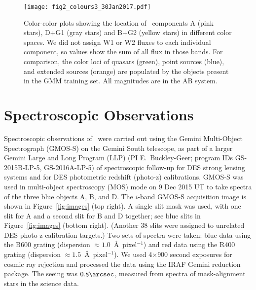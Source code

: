\documentclass[twocolumn]{aastex6}
\begin{document}
\begin{figure*}
\begin{center}
\hspace*{-1.5cm}\texttt{[image: fig2\_colours3\_30Jan2017.pdf]}
\end{center}
\caption{Color-color plots showing the location of \sysname\ components 
A (pink stars), D+G1 (gray stars) and B+G2 (yellow stars) in different color 
spaces. 
We did not assign W1 or W2 fluxes to each individual component, so values 
show the sum of all flux in those bands.  
For comparison, the color loci of quasars (green), point sources (blue), 
and extended sources (orange) are populated by the objects present in the 
GMM training set. All magnitudes are in the AB system.}
\label{fig:quadcolor}
\end{figure*}


\section{Spectroscopic Observations}\label{sec:spectra}

Spectroscopic observations of \sysname\ were carried out using the 
Gemini Multi-Object Spectrograph (GMOS-S) on the Gemini South telescope,
as part of a larger Gemini Large and Long Program (LLP) 
(PI E.\ Buckley-Geer; program IDs GS-2015B-LP-5, GS-2016A-LP-5)
of spectroscopic follow-up for DES strong lensing systems and 
for DES photometric redshift (photo-z) calibrations.
GMOS-S was used in multi-object spectroscopy (MOS) mode on 9 Dec 2015 UT
to take spectra of the three blue objects A, B, and D.
The $i$-band GMOS-S acquisition image is shown in 
Figure~\ref{fig:images} (top right).
A single slit mask was used, with one slit for A and
a second slit for B and D together; 
see blue slits in Figure~\ref{fig:images} (bottom right).
(Another 38 slits were assigned to unrelated DES photo-z calibration targets.)
Two sets of spectra were taken: blue data using the B600 grating
(dispersion $\approx 1.0$~\AA~pixel$^{-1}$) and red data using the 
R400 grating (dispersion $\approx 1.5$~\AA~pixel$^{-1}$).
We used 4$\times$900 second exposures for cosmic ray rejection
and processed the data using the IRAF Gemini reduction package.
The seeing was $0.8\arcsec$, measured from spectra of 
mask-alignment stars in the science data.
\end{document}
